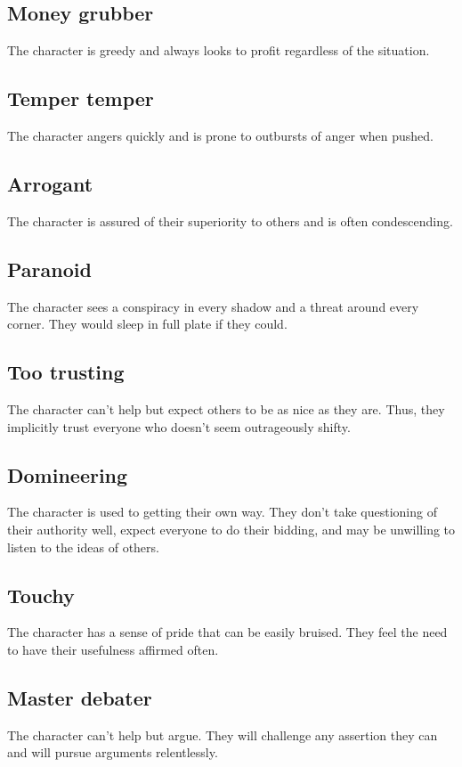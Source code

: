 \documentclass[a4paper,10pt,oneside]{book}
\begin{document}
\subsection{Money grubber}
The character is greedy and always looks to profit regardless of the situation.

\subsection{Temper temper}
The character angers quickly and is prone to outbursts of anger when pushed.

\subsection{Arrogant}
The character is assured of their superiority to others and is often condescending.

\subsection{Paranoid}
The character sees a conspiracy in every shadow and a threat around every corner. They would sleep in full plate if they could.

\subsection{Too trusting} 
The character can't help but expect others to be as nice as they are. Thus, they implicitly trust everyone who doesn't seem outrageously shifty.

\subsection{Domineering}
The character is used to getting their own way. They don't take questioning of their authority well, expect everyone to do their bidding, and may be unwilling to listen to the ideas of others.

\subsection{Touchy}
The character has a sense of pride that can be easily bruised. They feel the need to have their usefulness affirmed often.

\subsection{Master debater}
The character can't help but argue. They will challenge any assertion they can and will pursue arguments relentlessly.
\end{document}
